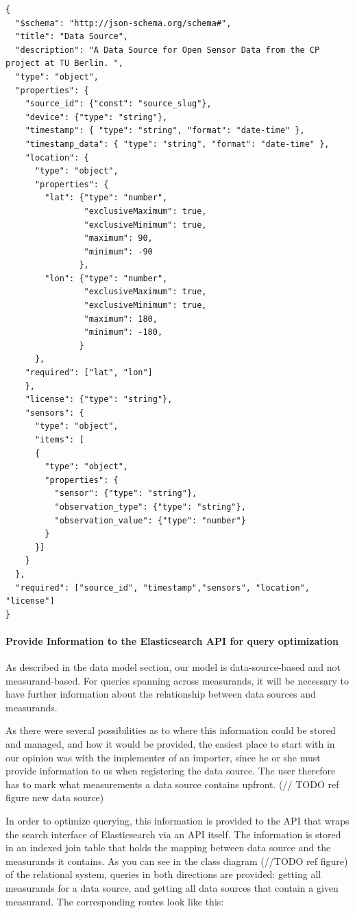 \begin{verbatim}
{
  "$schema": "http://json-schema.org/schema#",
  "title": "Data Source",
  "description": "A Data Source for Open Sensor Data from the CP project at TU Berlin. ",
  "type": "object",
  "properties": {
    "source_id": {"const": "source_slug"},
    "device": {"type": "string"},
    "timestamp": { "type": "string", "format": "date-time" },
    "timestamp_data": { "type": "string", "format": "date-time" },
    "location": {
      "type": "object",
      "properties": {
        "lat": {"type": "number",
                "exclusiveMaximum": true,
                "exclusiveMinimum": true,
                "maximum": 90,
                "minimum": -90
               },
        "lon": {"type": "number",
                "exclusiveMaximum": true,
                "exclusiveMinimum": true,
                "maximum": 180,
                "minimum": -180,
               }
      },
    "required": ["lat", "lon"]
    },
    "license": {"type": "string"},
    "sensors": {
      "type": "object",
      "items": [
      {
        "type": "object",
        "properties": {
          "sensor": {"type": "string"},
          "observation_type": {"type": "string"},
          "observation_value": {"type": "number"}
        }
      }]
    }
  },
  "required": ["source_id", "timestamp","sensors", "location", "license"]
}
\end{verbatim}

\paragraph{Provide Information to the Elasticsearch API for query
optimization}\label{provide-information-to-the-elasticsearch-api-for-query-optimization}

As described in the data model section, our model is data-source-based
and not measurand-based. For queries spanning across measurands, it will
be necessary to have further information about the relationship between
data sources and measurands.

As there were several possibilities as to where this information could
be stored and managed, and how it would be provided, the easiest place
to start with in our opinion was with the implementer of an importer,
since he or she must provide information to us when registering the data
source. The user therefore has to mark what measurements a data source
contains upfront. (// TODO ref figure new data source)

In order to optimize querying, this information is provided to the API
that wraps the search interface of Elasticsearch via an API itself. The
information is stored in an indexed join table that holds the mapping
between data source and the measurands it contains. As you can see in
the class diagram (//TODO ref figure) of the relational system, queries
in both directions are provided: getting all measurands for a data
source, and getting all data sources that contain a given measurand. The
corresponding routes look like this:

